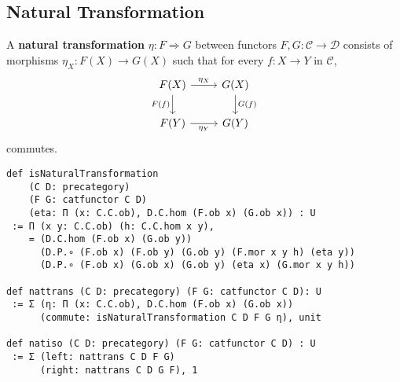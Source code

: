 \documentclass{article}
\begin{document}
\newpage
\subsection{Natural Transformation}
A \textbf{natural transformation} $\eta: F \Rightarrow G$ between functors $F, G: \mathcal{C} \to \mathcal{D}$ consists of morphisms $\eta_X: F(X) \to G(X)$ such that for every $f: X \to Y$ in $\mathcal{C}$,
\[
\begin{tikzcd}
F(X) \arrow[r, "\eta_X"] \arrow[d, "F(f)"'] & G(X) \arrow[d, "G(f)"] \\
F(Y) \arrow[r, "\eta_Y"'] & G(Y)
\end{tikzcd}
\]
commutes.
\begin{lstlisting}
def isNaturalTransformation
    (C D: precategory)
    (F G: catfunctor C D)
    (eta: Π (x: C.C.ob), D.C.hom (F.ob x) (G.ob x)) : U
 := Π (x y: C.C.ob) (h: C.C.hom x y),
    = (D.C.hom (F.ob x) (G.ob y))
      (D.P.∘ (F.ob x) (F.ob y) (G.ob y) (F.mor x y h) (eta y))
      (D.P.∘ (F.ob x) (G.ob x) (G.ob y) (eta x) (G.mor x y h))

def nattrans (C D: precategory) (F G: catfunctor C D): U
 := Σ (η: Π (x: C.C.ob), D.C.hom (F.ob x) (G.ob x))
      (commute: isNaturalTransformation C D F G η), unit

def natiso (C D: precategory) (F G: catfunctor C D) : U
 := Σ (left: nattrans C D F G)
      (right: nattrans C D G F), 1
\end{lstlisting}

\newpage
\end{document}
